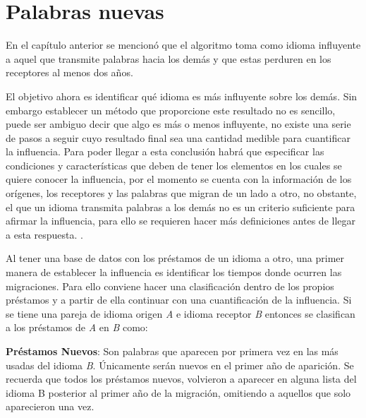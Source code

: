 \chapter{Palabras nuevas}
En el capítulo anterior se mencionó que el algoritmo toma como  idioma
influyente a aquel que transmite palabras hacia los demás y que estas perduren
en los receptores al menos dos años.

El objetivo ahora es identificar qué idioma es más influyente sobre los demás.
Sin embargo establecer un método que proporcione este resultado no es sencillo,
puede ser ambiguo decir que algo es más o menos influyente, no existe una serie
de pasos a seguir cuyo resultado final sea una cantidad medible para
cuantificar la influencia. Para poder llegar a esta conclusión habrá que
especificar las condiciones y características que deben de tener los elementos
en los cuales se quiere conocer la influencia,  por el momento se cuenta con la
información de los orígenes, los receptores y las palabras que migran de un
lado a otro, no obstante, el que un idioma transmita palabras a los demás no es
un criterio suficiente para afirmar la influencia, para ello se requieren hacer
más definiciones antes de llegar a esta respuesta.  .

Al tener una base de datos  con los préstamos de un idioma a otro,  una primer
manera de establecer la influencia es  identificar los tiempos donde ocurren
las migraciones.  Para ello conviene hacer una clasificación dentro de los
propios préstamos y a partir de ella  continuar con una cuantificación de la
influencia.  Si se tiene una pareja de idioma origen \textit{A} e idioma
receptor \textit{B} entonces se clasifican a los préstamos de \textit{A} en
\textit{B} como:

\textbf{Préstamos Nuevos}: Son palabras que aparecen por primera vez en las más
usadas del idioma \textit{B}.  Únicamente serán nuevos en el primer año de
aparición.  Se recuerda que todos los préstamos nuevos, volvieron a aparecer en
alguna lista del idioma B posterior al primer año de la migración, omitiendo a
aquellos que solo aparecieron una vez. 

